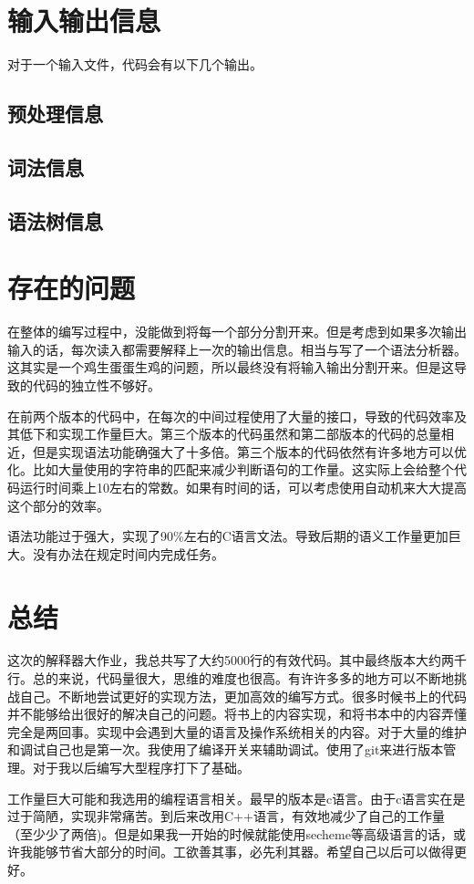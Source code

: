 \documentclass[12pt,a4paper]{ctexrep}
\begin{document}
\section{输入输出信息}
对于一个输入文件，代码会有以下几个输出。

\subsection{预处理信息}

\subsection{词法信息}

\subsection{语法树信息}

\section{存在的问题}
在整体的编写过程中，没能做到将每一个部分分割开来。但是考虑到如果多次输出输入的话，每次读入都需要解释上一次的输出信息。相当与写了一个语法分析器。这其实是一个鸡生蛋蛋生鸡的问题，所以最终没有将输入输出分割开来。但是这导致的代码的独立性不够好。\par
在前两个版本的代码中，在每次的中间过程使用了大量的接口，导致的代码效率及其低下和实现工作量巨大。第三个版本的代码虽然和第二部版本的代码的总量相近，但是实现语法功能确强大了十多倍。第三个版本的代码依然有许多地方可以优化。比如大量使用的字符串的匹配来减少判断语句的工作量。这实际上会给整个代码运行时间乘上10左右的常数。如果有时间的话，可以考虑使用自动机来大大提高这个部分的效率。\par
语法功能过于强大，实现了90\%左右的C语言文法。导致后期的语义工作量更加巨大。没有办法在规定时间内完成任务。\par
\section{总结}
这次的解释器大作业，我总共写了大约5000行的有效代码。其中最终版本大约两千行。总的来说，代码量很大，思维的难度也很高。有许许多多的地方可以不断地挑战自己。不断地尝试更好的实现方法，更加高效的编写方式。很多时候书上的代码并不能够给出很好的解决自己的问题。将书上的内容实现，和将书本中的内容弄懂完全是两回事。实现中会遇到大量的语言及操作系统相关的内容。对于大量的维护和调试自己也是第一次。我使用了编译开关来辅助调试。使用了git来进行版本管理。对于我以后编写大型程序打下了基础。\par
工作量巨大可能和我选用的编程语言相关。最早的版本是c语言。由于c语言实在是过于简陋，实现非常痛苦。到后来改用C++语言，有效地减少了自己的工作量（至少少了两倍)。但是如果我一开始的时候就能使用secheme等高级语言的话，或许我能够节省大部分的时间。工欲善其事，必先利其器。希望自己以后可以做得更好。\par
\end{document}
